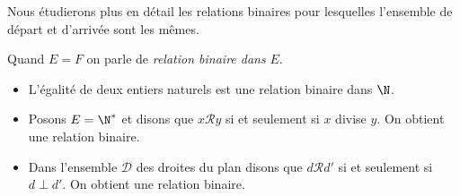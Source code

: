 Nous étudierons plus en détail les relations binaires pour lesquelles l'ensemble de départ et d'arrivée sont les mêmes.

\begin{definition}
    Quand $E=F$ on parle de \textit{relation binaire dans} $E$.
\end{definition}

\begin{exemple}[s]

    \begin{itemize}
        \item 	L'égalité de deux entiers naturels est une relation binaire dans $\N$.
        \item 	Posons $E=\N^*$ et disons que $x\mathcal{R}y$ si et seulement si $x$ divise $y$. On obtient une relation binaire.
        \item 	Dans l'ensemble $\mathcal{D}$ des droites du plan disons que $d\mathcal{R}d'$ si et seulement si $d\perp d'$. On obtient une relation binaire.
    \end{itemize}
\end{exemple}

